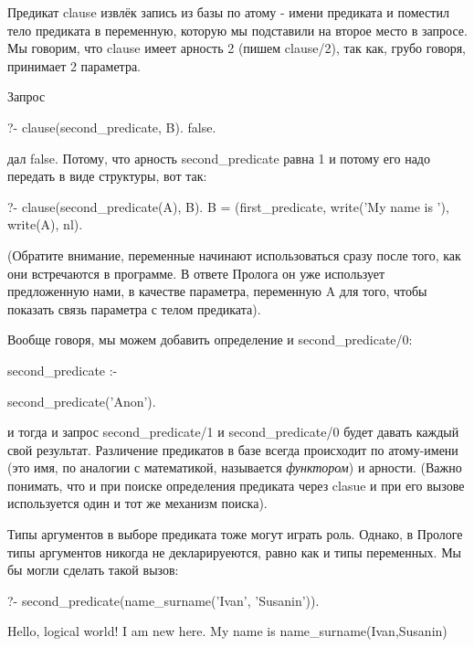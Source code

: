 \documentclass[a4paper]{book}
\begin{document}
Предикат clause извлёк запись из базы по атому - имени
предиката и поместил тело предиката в переменную, которую мы
подставили на второе место в запросе. Мы говорим, что clause
имеет арность 2 (пишем clause/2), так как, грубо говоря,
принимает 2 параметра.

Запрос  

\begin{example}{}{}
?- clause(second_predicate, B).
false.
\end{example}

дал false. Потому, что арность second_predicate равна 1 и потому
его надо передать в виде структуры, вот так:

\begin{example}{}{}
?- clause(second_predicate(A), B).                        
B = (first_predicate, write('My name is '), write(A),
 nl).                                                    
\end{example}

(Обратите внимание, переменные начинают использоваться сразу
после того, как они встречаются в программе. В ответе Пролога он
уже использует предложенную нами, в качестве параметра,
переменную A для того, чтобы показать связь параметра с телом
предиката).

Вообще говоря, мы можем добавить определение и
second_predicate/0:

\begin{example}{}{}
second_predicate :-

   second_predicate('Anon').
\end{example}

и тогда и запрос second_predicate/1 и second_predicate/0 будет
давать каждый свой результат. Различение предикатов в базе всегда
происходит по атому-имени (это имя, по аналогии с математикой,
называется {\it функтором\/}) и арности. (Важно понимать, что и
при поиске определения предиката через clasue и при его вызове
используется один и тот же механизм поиска).

Типы аргументов в выборе предиката тоже могут играть
роль. Однако, в Прологе типы аргументов никогда не декларируеются,
равно как и типы переменных. Мы бы могли сделать такой вызов:

\begin{example}{}{}
?- second_predicate(name_surname('Ivan', 'Susanin')).

Hello, logical world!
I am new here.
My name is name_surname(Ivan,Susanin)
\end{example}
\end{document}
